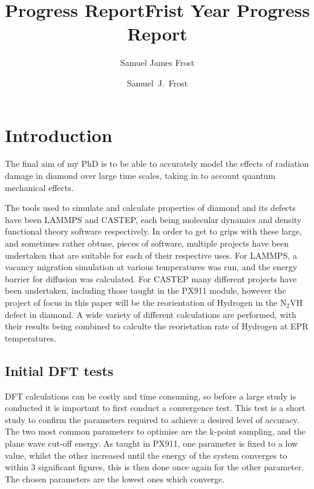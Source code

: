 \documentclass[10pt,a4paper,twocolumn,twoside]{extarticle}
\title{Progress Report}
\author{Samuel James Frost}
\title{Frist Year Progress Report}
\author{Samuel~J.~Frost}
\begin{document}
	\thispagestyle{empty}
	\tableofcontents

	
\section{Introduction}

The final aim of my PhD is to be able to accurately model the effects of radiation damage in diamond over large time scales, taking in to account quantum mechanical effects.



The tools used to simulate and calculate properties of diamond and its defects have been LAMMPS and CASTEP, each being molecular dynamics and density functional theory software respectively. In order to get to grips with these large, and sometimes rather obtuse, pieces of software, multiple projects have been undertaken that are suitable for each of their respective uses. For LAMMPS, a vacancy migration simulation at various temperatures was run, and the energy barrier for diffusion was calculated. For CASTEP many different projects have been undertaken, including those taught in the PX911 module, however the project of focus in this paper will be the reorientation of Hydrogen in the N$_2$VH defect in diamond. A wide variety of different calculations are performed, with their results being combined to calculte the reorietation rate of Hydrogen at EPR temperatures. 

\subsection{Initial DFT tests}
DFT calculations can be costly and time consuming, so before a large study is conducted it is important to first conduct a convergence test. This test is a short study to confirm the parameters required to achieve a desired level of accuracy. The two most common parameters to optimise are the k-point sampling, and the plane wave cut-off energy. As taught in PX911, one parameter is fixed to a low value, whilst the other increased until the energy of the system converges to within 3 significant figures, this is then done once again for the other parameter. The chosen parameters are the lowest ones which converge. 
\end{document}
